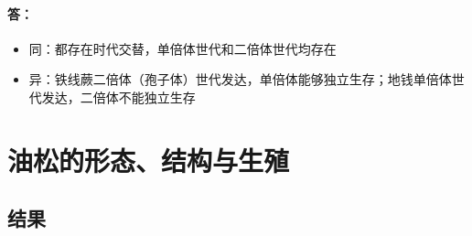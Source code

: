 \documentclass[utf8]{ctexart}
\begin{document}
    \paragraph*{答：}
    \begin{itemize}
        \item {同：}都存在时代交替，单倍体世代和二倍体世代均存在
        \item {异：}铁线蕨二倍体（孢子体）世代发达，单倍体能够独立生存；地钱单倍体世代发达，二倍体不能独立生存
    \end{itemize} 
    \section{油松的形态、结构与生殖}
\subsection*{结果}
\end{document}
